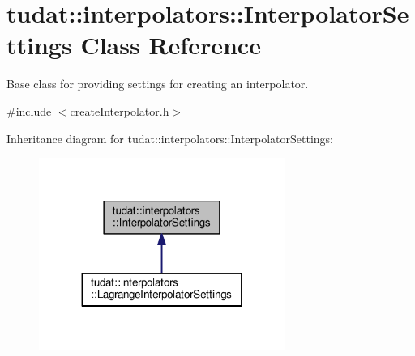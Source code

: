 \hypertarget{classtudat_1_1interpolators_1_1InterpolatorSettings}{}\section{tudat\+:\+:interpolators\+:\+:Interpolator\+Settings Class Reference}
\label{classtudat_1_1interpolators_1_1InterpolatorSettings}


Base class for providing settings for creating an interpolator.  




{\ttfamily \#include $<$create\+Interpolator.\+h$>$}



Inheritance diagram for tudat\+:\+:interpolators\+:\+:Interpolator\+Settings\+:
\nopagebreak
\begin{figure}[H]
\begin{center}
\leavevmode
\includegraphics[width=227pt]{classtudat_1_1interpolators_1_1InterpolatorSettings__inherit__graph}
\end{center}
\end{figure}
